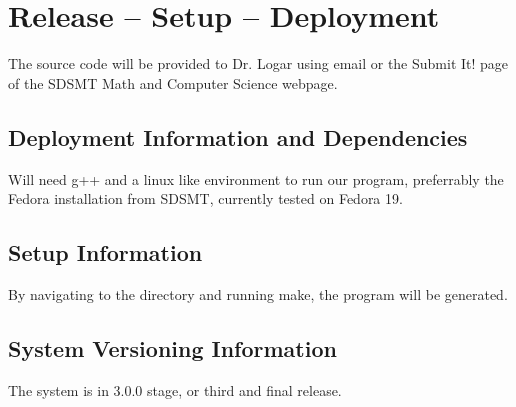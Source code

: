 
\chapter{Release -- Setup -- Deployment}
The source code will be provided to Dr. Logar using email or the Submit It! page of
the SDSMT Math and Computer Science webpage.


\section{Deployment Information and Dependencies}
Will need g++ and a linux like environment to run our program, preferrably the 
Fedora installation from SDSMT, currently tested on Fedora 19.


\section{Setup Information}
By navigating to the directory and running make, the program will be generated.


\section{System  Versioning Information}
The system is in 3.0.0 stage, or third and final release.
